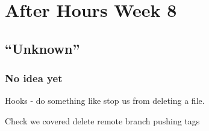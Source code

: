 \chapter{After Hours Week 8}
\section{``Unknown''}
\subsection{No idea yet}
Hooks - do something like stop us from deleting a file.


Check we covered 
delete remote branch
pushing tags
